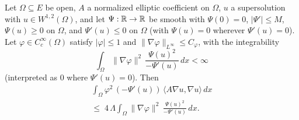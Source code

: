 \begin{theorem}
\label{thm:weighted-cacc}
\leanok
{}
Let $\Omega \subseteq E$ be open, $A$ a normalized elliptic coefficient on
$\Omega$, $u$ a supersolution with $u \in W^{1,2}(\Omega)$, and let
$\Psi : \mathbb{R} \to \mathbb{R}$ be smooth with $\Psi(0)=0$, $|\Psi'| \leq M$, $\Psi(u) \geq 0$
on $\Omega$, and $\Psi'(u) \leq 0$ on $\Omega$ (with $\Psi(u)=0$ wherever
$\Psi'(u)=0$). Let $\varphi \in C^{\infty}_c(\Omega)$ satisfy $|\varphi| \leq 1$
and $\|\nabla \varphi\|_{L^\infty} \leq C_\varphi$, with the integrability
\begin{equation*}
  \int_{\Omega} \|\nabla \varphi\|^{2}\,
  \frac{\Psi(u)^{2}}{-\Psi'(u)}\,dx < \infty
\end{equation*}
(interpreted as $0$ where $\Psi'(u)=0$). Then
\begin{multline*}
  \int_{\Omega} \varphi^{2}\,(-\Psi'(u))\,\langle A\nabla u,\nabla u\rangle\,dx
  \\ \leq\;
  4\,\Lambda \int_{\Omega} \|\nabla \varphi\|^{2}\,
  \frac{\Psi(u)^{2}}{-\Psi'(u)}\,dx.
\end{multline*}
\end{theorem}

